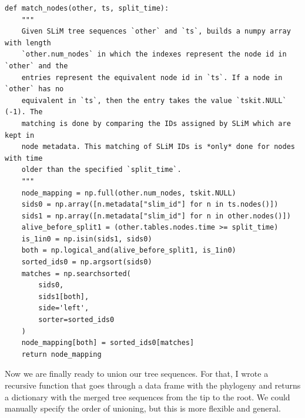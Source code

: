 \documentclass[12pt]{article}
\begin{document}
\begin{verbatim}
def match_nodes(other, ts, split_time):
    """
    Given SLiM tree sequences `other` and `ts`, builds a numpy array with length
    `other.num_nodes` in which the indexes represent the node id in `other` and the
    entries represent the equivalent node id in `ts`. If a node in `other` has no
    equivalent in `ts`, then the entry takes the value `tskit.NULL` (-1). The
    matching is done by comparing the IDs assigned by SLiM which are kept in
    node metadata. This matching of SLiM IDs is *only* done for nodes with time
    older than the specified `split_time`.
    """
    node_mapping = np.full(other.num_nodes, tskit.NULL)
    sids0 = np.array([n.metadata["slim_id"] for n in ts.nodes()])
    sids1 = np.array([n.metadata["slim_id"] for n in other.nodes()])
    alive_before_split1 = (other.tables.nodes.time >= split_time)
    is_1in0 = np.isin(sids1, sids0)
    both = np.logical_and(alive_before_split1, is_1in0)
    sorted_ids0 = np.argsort(sids0)
    matches = np.searchsorted(
        sids0,
        sids1[both],
        side='left',
        sorter=sorted_ids0
    )
    node_mapping[both] = sorted_ids0[matches]
    return node_mapping
\end{verbatim}

Now we are finally ready to union our tree sequences.
For that, I wrote a recursive function that goes through a data frame with the phylogeny
and returns a dictionary with the merged tree sequences from the tip to the root.
We could manually specify the order of unioning, but this is more flexible and general.
\end{document}
